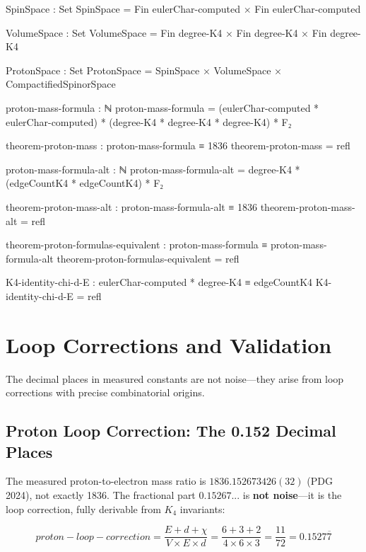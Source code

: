 \documentclass[11pt,a4paper]{book}
\def\text#1{#1}%
\begin{document}
\begin{code}
SpinSpace : Set
SpinSpace = Fin eulerChar-computed × Fin eulerChar-computed

VolumeSpace : Set
VolumeSpace = Fin degree-K4 × Fin degree-K4 × Fin degree-K4

ProtonSpace : Set
ProtonSpace = SpinSpace × VolumeSpace × CompactifiedSpinorSpace

proton-mass-formula : ℕ
proton-mass-formula = (eulerChar-computed * eulerChar-computed) * (degree-K4 * degree-K4 * degree-K4) * F₂

theorem-proton-mass : proton-mass-formula ≡ 1836
theorem-proton-mass = refl

proton-mass-formula-alt : ℕ
proton-mass-formula-alt = degree-K4 * (edgeCountK4 * edgeCountK4) * F₂

theorem-proton-mass-alt : proton-mass-formula-alt ≡ 1836
theorem-proton-mass-alt = refl

theorem-proton-formulas-equivalent : proton-mass-formula ≡ proton-mass-formula-alt
theorem-proton-formulas-equivalent = refl

K4-identity-chi-d-E : eulerChar-computed * degree-K4 ≡ edgeCountK4
K4-identity-chi-d-E = refl
\end{code}

\chapter{Loop Corrections and Validation}
\label{chap:loop-corrections}

The decimal places in measured constants are not noise---they arise from loop corrections with precise combinatorial origins.

\section{Proton Loop Correction: The 0.152 Decimal Places}

The measured proton-to-electron mass ratio is $1836.152673426(32)$ (PDG 2024), not exactly 1836.
The fractional part $0.15267...$ is \textbf{not noise}---it is the loop correction,
fully derivable from $K_4$ invariants:

\[
\text{proton-loop-correction} = \frac{E + d + \chi}{V \times E \times d} = \frac{6 + 3 + 2}{4 \times 6 \times 3} = \frac{11}{72} = 0.1527\overline{7}
\]
\end{document}
